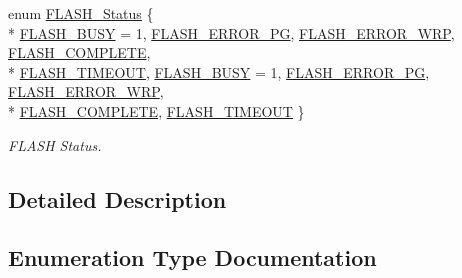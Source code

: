 \begin{DoxyCompactItemize}
\item 
enum \hyperlink{group___f_l_a_s_h___exported___types_gadc63a6f3404ff1f71229a66915e9cdc0}{F\+L\+A\+S\+H\+\_\+\+Status} \{ \\*
\hyperlink{group___f_l_a_s_h___exported___types_ggadc63a6f3404ff1f71229a66915e9cdc0aa25021d41842af8a68cefcb65949e099}{F\+L\+A\+S\+H\+\_\+\+B\+U\+SY} = 1, 
\hyperlink{group___f_l_a_s_h___exported___types_ggadc63a6f3404ff1f71229a66915e9cdc0adcb0c5002fc757739886a2601a3981da}{F\+L\+A\+S\+H\+\_\+\+E\+R\+R\+O\+R\+\_\+\+PG}, 
\hyperlink{group___f_l_a_s_h___exported___types_ggadc63a6f3404ff1f71229a66915e9cdc0ac9e2d95d3ba415fb7392d72a2458f4d8}{F\+L\+A\+S\+H\+\_\+\+E\+R\+R\+O\+R\+\_\+\+W\+RP}, 
\hyperlink{group___f_l_a_s_h___exported___types_ggadc63a6f3404ff1f71229a66915e9cdc0ab0e88e9f59edee379a1a710a8b7deebf}{F\+L\+A\+S\+H\+\_\+\+C\+O\+M\+P\+L\+E\+TE}, 
\\*
\hyperlink{group___f_l_a_s_h___exported___types_ggadc63a6f3404ff1f71229a66915e9cdc0a90c514b6a619e3a4e6c2eec3154323f8}{F\+L\+A\+S\+H\+\_\+\+T\+I\+M\+E\+O\+UT}, 
\hyperlink{group___f_l_a_s_h___exported___types_ggadc63a6f3404ff1f71229a66915e9cdc0aa25021d41842af8a68cefcb65949e099}{F\+L\+A\+S\+H\+\_\+\+B\+U\+SY} = 1, 
\hyperlink{group___f_l_a_s_h___exported___types_ggadc63a6f3404ff1f71229a66915e9cdc0adcb0c5002fc757739886a2601a3981da}{F\+L\+A\+S\+H\+\_\+\+E\+R\+R\+O\+R\+\_\+\+PG}, 
\hyperlink{group___f_l_a_s_h___exported___types_ggadc63a6f3404ff1f71229a66915e9cdc0ac9e2d95d3ba415fb7392d72a2458f4d8}{F\+L\+A\+S\+H\+\_\+\+E\+R\+R\+O\+R\+\_\+\+W\+RP}, 
\\*
\hyperlink{group___f_l_a_s_h___exported___types_ggadc63a6f3404ff1f71229a66915e9cdc0ab0e88e9f59edee379a1a710a8b7deebf}{F\+L\+A\+S\+H\+\_\+\+C\+O\+M\+P\+L\+E\+TE}, 
\hyperlink{group___f_l_a_s_h___exported___types_ggadc63a6f3404ff1f71229a66915e9cdc0a90c514b6a619e3a4e6c2eec3154323f8}{F\+L\+A\+S\+H\+\_\+\+T\+I\+M\+E\+O\+UT}
 \}\begin{DoxyCompactList}\small\item\em F\+L\+A\+SH Status. \end{DoxyCompactList}
\end{DoxyCompactItemize}


\subsection{Detailed Description}


\subsection{Enumeration Type Documentation}
